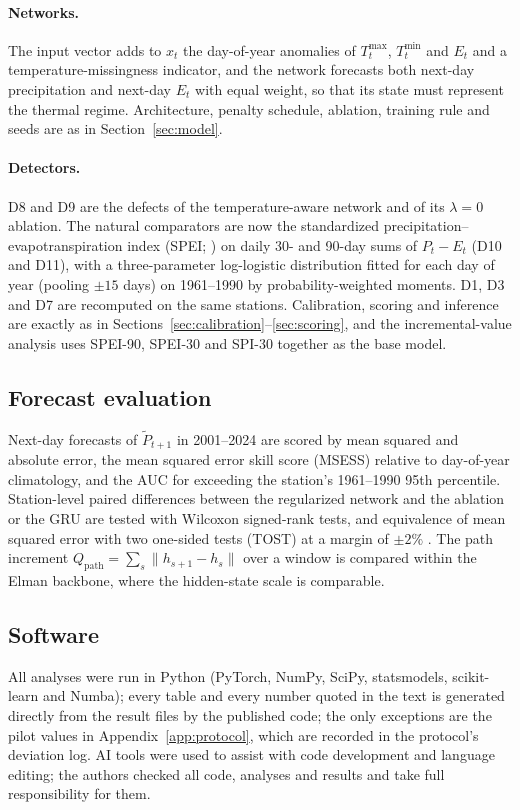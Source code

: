 \documentclass[pdflatex,sn-mathphys-ay]{sn-jnl}
\theoremstyle{thmstyletwo}
\begin{document}
\paragraph{Networks.} The input vector adds to $x_t$ the day-of-year anomalies of $T^{\max}_t$,
$T^{\min}_t$ and $E_t$ and a temperature-missingness indicator, and the network forecasts both next-day
precipitation and next-day $E_t$ with equal weight, so that its state must represent the thermal regime.
Architecture, penalty schedule, ablation, training rule and seeds are as in Section~\ref{sec:model}.

\paragraph{Detectors.} D8 and D9 are the defects of the temperature-aware network and of its $\lambda=0$
ablation. The natural comparators are now the standardized precipitation--evapotranspiration index
(SPEI; \citealp{vicenteserrano2010}) on daily 30- and 90-day sums of $P_t-E_t$ (D10 and D11), with a
three-parameter log-logistic distribution fitted for each day of year (pooling $\pm15$ days) on 1961--1990
by probability-weighted moments. D1, D3 and D7 are recomputed on the same stations. Calibration, scoring and
inference are exactly as in Sections~\ref{sec:calibration}--\ref{sec:scoring}, and the incremental-value
analysis uses SPEI-90, SPEI-30 and SPI-30 together as the base model.

\subsection{Forecast evaluation}\label{sec:forecast_methods}
Next-day forecasts of $\tilde P_{t+1}$ in 2001--2024 are scored by mean squared and absolute error, the
mean squared error skill score (MSESS) relative to day-of-year climatology, and the AUC for exceeding
the station's 1961--1990 95th percentile. Station-level paired differences between the regularized
network and the ablation or the GRU are tested with Wilcoxon signed-rank tests, and equivalence of
mean squared error with two one-sided tests (TOST) at a margin of $\pm2\%$ \citep{schuirmann1987}. The
path increment $Q_{\mathrm{path}}=\sum_s\|h_{s+1}-h_s\|$ over a window is compared within the Elman
backbone, where the hidden-state scale is comparable.

\subsection{Software}\label{sec:software}
All analyses were run in Python (PyTorch, NumPy, SciPy, statsmodels, scikit-learn and Numba); every
table and every number quoted in the text is generated directly from the result files by the published
code; the only exceptions are the pilot values in Appendix~\ref{app:protocol}, which are recorded in the
protocol's deviation log. AI tools were used to assist with code development and language editing; the authors checked all
code, analyses and results and take full responsibility for them.
\end{document}
